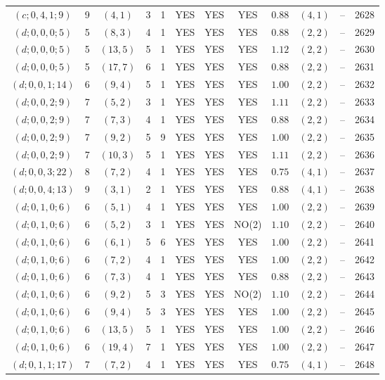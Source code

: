\begin{longtable}{|c|c|c|c|c|c|c|c|c|c|c|c|}
$(c;0,4,1;9)$ & 9 & $(4,1)$ & 3 & 1 & YES & YES & YES & $0.88$ & $(4,1)$ & -- & 2628\\
$(d;0,0,0;5)$ & 5 & $(8,3)$ & 4 & 1 & YES & YES & YES & $0.88$ & $(2,2)$ & -- & 2629\\
$(d;0,0,0;5)$ & 5 & $(13,5)$ & 5 & 1 & YES & YES & YES & $1.12$ & $(2,2)$ & -- & 2630\\
$(d;0,0,0;5)$ & 5 & $(17,7)$ & 6 & 1 & YES & YES & YES & $0.88$ & $(2,2)$ & -- & 2631\\
$(d;0,0,1;14)$ & 6 & $(9,4)$ & 5 & 1 & YES & YES & YES & $1.00$ & $(2,2)$ & -- & 2632\\
$(d;0,0,2;9)$ & 7 & $(5,2)$ & 3 & 1 & YES & YES & YES & $1.11$ & $(2,2)$ & -- & 2633\\
$(d;0,0,2;9)$ & 7 & $(7,3)$ & 4 & 1 & YES & YES & YES & $0.88$ & $(2,2)$ & -- & 2634\\
$(d;0,0,2;9)$ & 7 & $(9,2)$ & 5 & 9 & YES & YES & YES & $1.00$ & $(2,2)$ & -- & 2635\\
$(d;0,0,2;9)$ & 7 & $(10,3)$ & 5 & 1 & YES & YES & YES & $1.11$ & $(2,2)$ & -- & 2636\\
$(d;0,0,3;22)$ & 8 & $(7,2)$ & 4 & 1 & YES & YES & YES & $0.75$ & $(4,1)$ & -- & 2637\\
$(d;0,0,4;13)$ & 9 & $(3,1)$ & 2 & 1 & YES & YES & YES & $0.88$ & $(4,1)$ & -- & 2638\\
$(d;0,1,0;6)$ & 6 & $(5,1)$ & 4 & 1 & YES & YES & YES & $1.00$ & $(2,2)$ & -- & 2639\\
$(d;0,1,0;6)$ & 6 & $(5,2)$ & 3 & 1 & YES & YES & NO(2) & $1.10$ & $(2,2)$ & -- & 2640\\
$(d;0,1,0;6)$ & 6 & $(6,1)$ & 5 & 6 & YES & YES & YES & $1.00$ & $(2,2)$ & -- & 2641\\
$(d;0,1,0;6)$ & 6 & $(7,2)$ & 4 & 1 & YES & YES & YES & $1.00$ & $(2,2)$ & -- & 2642\\
$(d;0,1,0;6)$ & 6 & $(7,3)$ & 4 & 1 & YES & YES & YES & $0.88$ & $(2,2)$ & -- & 2643\\
$(d;0,1,0;6)$ & 6 & $(9,2)$ & 5 & 3 & YES & YES & NO(2) & $1.10$ & $(2,2)$ & -- & 2644\\
$(d;0,1,0;6)$ & 6 & $(9,4)$ & 5 & 3 & YES & YES & YES & $1.00$ & $(2,2)$ & -- & 2645\\
$(d;0,1,0;6)$ & 6 & $(13,5)$ & 5 & 1 & YES & YES & YES & $1.00$ & $(2,2)$ & -- & 2646\\
$(d;0,1,0;6)$ & 6 & $(19,4)$ & 7 & 1 & YES & YES & YES & $1.00$ & $(2,2)$ & -- & 2647\\
$(d;0,1,1;17)$ & 7 & $(7,2)$ & 4 & 1 & YES & YES & YES & $0.75$ & $(4,1)$ & -- & 2648\\

\end{longtable}
